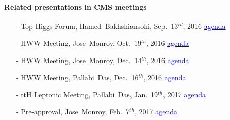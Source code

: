 \paragraph*{Related presentations in CMS meetings}
\begin{itemize}
	\item[-] Top Higgs Forum, Hamed~Bakhshiansohi, Sep.~13$^{rd}$, 2016 \hfill{\small \href{https://indico.cern.ch/event/567994/}{\textcolor{blue}{agenda}}}
	\item[-] HWW Meeting, Jose~Monroy, Oct.~19$^{th}$, 2016 \hfill{\small \href{https://indico.cern.ch/event/566851/#b-225107-higgs-to-ww}{\textcolor{blue}{agenda}}}
	\item[-] HWW Meeting, Jose~Monroy, Dec.~14$^{th}$, 2016 \hfill{\small \href{https://indico.cern.ch/event/566859/#b-225187-higgs-to-ww}{\textcolor{blue}{agenda}}}
	\item[-] HWW Meeting, Pallabi~Das, Dec.~16$^{th}$, 2016 \hfill{\small \href{https://indico.cern.ch/event/566826/#b-235251-hwwwwleptons-cross-in}{\textcolor{blue}{agenda}}}
	\item[-] ttH Leptonic Meeting, Pallabi~Das, Jan.~19$^{th}$, 2017 \hfill{\small \href{https://indico.cern.ch/event/598405/?filterActive=1&showDate=all&showSession=16}{\textcolor{blue}{agenda}}}
	\item[-] Pre-approval, Jose~Monroy, Feb.~7$^{th}$, 2017 \hfill{\small \href{https://indico.cern.ch/event/605481/#b-240093-higgs-meeting-moriond}{\textcolor{blue}{agenda}}}
\end{itemize}
